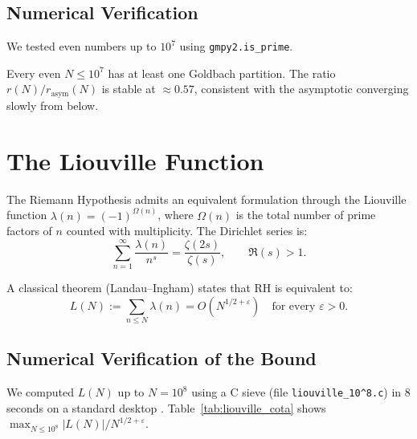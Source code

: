 \documentclass{sbc2023-pdf}%
\theoremstyle{plain}
\begin{document}
\subsection{Numerical Verification}

We tested even numbers up to \(10^7\) using {\tt gmpy2.is\_prime}.

\begin{table}[htbp]
\centering
\caption{Goldbach partition counts.}
\label{tab:goldbach}
\end{table}

Every even \(N \le 10^7\) has at least one Goldbach partition. The ratio \(r(N)/r_{\text{asym}}(N)\) is stable at \(\approx0.57\), consistent with the asymptotic converging slowly from below.

\section{The Liouville Function}
\label{sec:liouville}

The Riemann Hypothesis admits an equivalent formulation through the Liouville function \(\lambda(n)=(-1)^{\Omega(n)}\), where \(\Omega(n)\) is the total number of prime factors of \(n\) counted with multiplicity. The Dirichlet series is:
\[
\sum_{n=1}^{\infty}\frac{\lambda(n)}{n^{s}} = \frac{\zeta(2s)}{\zeta(s)},\qquad \Re(s)>1.
\]

A classical theorem (Landau--Ingham) states that RH is equivalent to:
\[
\boxed{L(N):=\sum_{n\le N}\lambda(n)=O(N^{1/2+\varepsilon})\quad\text{for every }\varepsilon>0.}
\]

\subsection{Numerical Verification of the Bound}

We computed \(L(N)\) up to \(N=10^{8}\) using a C sieve (file {\tt liouville\_10\^{}8.c}) in 8 seconds on a standard desktop \citep{titchmarsh1986}. Table~\ref{tab:liouville_cota} shows \(\max_{N\le10^{8}}|L(N)|/N^{1/2+\varepsilon}\).
\end{document}
